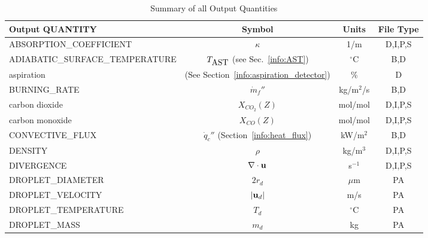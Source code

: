 \documentclass[11pt]{book}
\newcommand{\bu}{{\bf u}}
\newcommand{\dq}{\dot{q}}
\newcommand{\dm}{\dot{m}}
\begin{document}
\begin{table}[h!]
\begin{center}
\caption{Summary of all Output Quantities}
\begin{tabular}{|l|c|c|c|}
\hline
Output {\ct QUANTITY}                           & Symbol                                        & Units          & File Type    \\ \hline \hline
{\ct ABSORPTION\_COEFFICIENT}                   & $\kappa$                                      & 1/m            & D,I,P,S      \\ \hline
{\ct ADIABATIC\_SURFACE\_TEMPERATURE}           & $T_{\hbox{AST}}$ (see Sec.~\ref{info:AST})    & $^\circ$C      & B,D          \\ \hline
{\ct aspiration}                                & (See Section~\ref{info:aspiration_detector})  & \%             & D            \\ \hline
{\ct BURNING\_RATE}                             & $\dm_f''$                                     & kg/m$^2$/s     & B,D          \\ \hline
{\ct carbon dioxide}                            & $X_{CO_2}(Z)$                                 & mol/mol        & D,I,P,S      \\ \hline
{\ct carbon monoxide}                           & $X_{CO}(Z)$                                   & mol/mol        & D,I,P,S      \\ \hline
{\ct CONVECTIVE\_FLUX}                          & $\dq_c''$ (Section~\ref{info:heat_flux})      & kW/m$^2$       & B,D          \\ \hline
{\ct DENSITY}                                   & $\rho$                                        & kg/m$^3$       & D,I,P,S      \\ \hline
{\ct DIVERGENCE}                                & $\nabla \cdot \bu$                            & s$^{-1}$       & D,I,P,S      \\ \hline
{\ct DROPLET\_DIAMETER}                         & $2 r_d$                                       & $\mu$m         & PA           \\ \hline
{\ct DROPLET\_VELOCITY}                         & $|\bu_d|$                                     & m/s            & PA           \\ \hline
{\ct DROPLET\_TEMPERATURE}                      & $T_d$                                         & $^\circ$C      & PA           \\ \hline
{\ct DROPLET\_MASS}                             & $m_d$                                         & kg             & PA           \\ \hline

\end{tabular}
\end{center}
\end{table}
\end{document}

